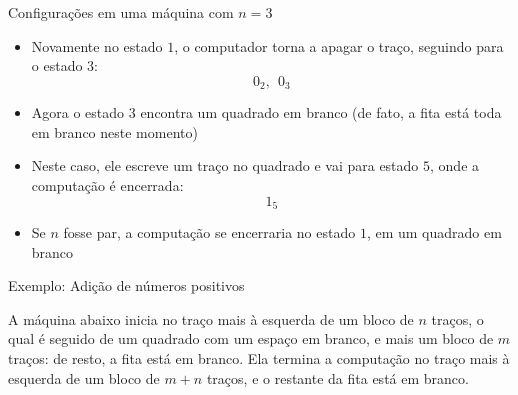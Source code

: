 \begin{frame}[fragile]{Configurações em uma máquina com $n=3$}

    \begin{itemize}
        \item Novamente no estado $1$, o computador torna a apagar o traço, seguindo para o 
            estado $3$:
        \[
            0_2,\ \ 0_3
        \]

        \item Agora o estado $3$ encontra um quadrado em branco (de fato, a fita está toda em
            branco neste momento)

        \item Neste caso, ele escreve um traço no quadrado e vai para estado $5$, onde a 
            computação é encerrada:
        \[
            1_5
        \]

        \item Se $n$ fosse par, a computação se encerraria no estado $1$, em um quadrado em branco
    \end{itemize}

\end{frame}

\begin{frame}[fragile]{Exemplo: Adição de números positivos}

    A máquina abaixo inicia no traço mais à esquerda de um bloco de $n$ traços, o qual é seguido
    de um quadrado com um espaço em branco, e mais um bloco de $m$ traços: de resto, a fita está
    em branco. Ela termina a computação no traço mais à esquerda de um bloco de $m+n$ traços, e 
    o restante da fita está em branco.

    \vspace{0.3in}
    
    \begin{figure}[h]
        \centering
    \end{figure}

\end{frame}

